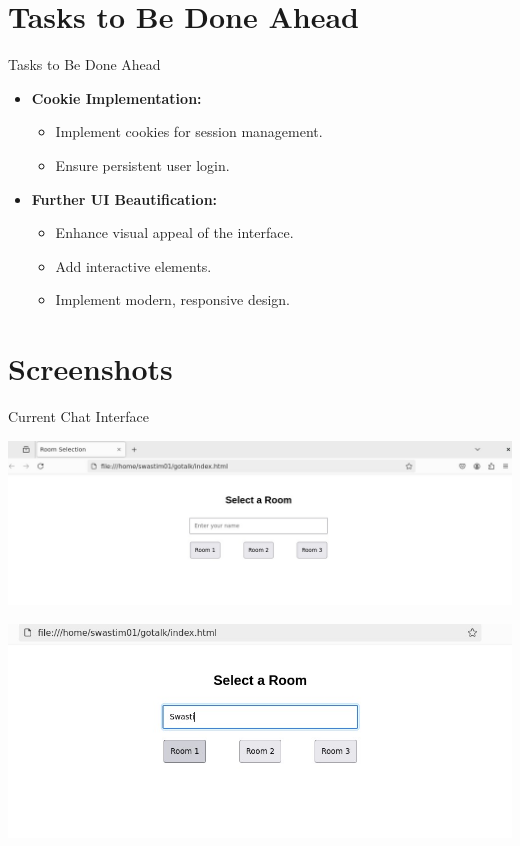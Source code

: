 \documentclass{beamer}
\begin{document}
\section{Tasks to Be Done Ahead}

\begin{frame}{Tasks to Be Done Ahead}
    \begin{itemize}
        \item \textbf{Cookie Implementation:}
        \begin{itemize}
            \item Implement cookies for session management.
            \item Ensure persistent user login.
        \end{itemize}
        \item \textbf{Further UI Beautification:}
        \begin{itemize}
            \item Enhance visual appeal of the interface.
            \item Add interactive elements.
            \item Implement modern, responsive design.
        \end{itemize}
    \end{itemize}
\end{frame}

\section{Screenshots}
\begin{frame}{Current Chat Interface}
        \begin{minipage}[t]{0.5\textwidth}
            \centering
            \includegraphics[width=\textwidth]{room created.jpg}
        \end{minipage}
        \hfill
        \begin{minipage}[t]{0.5\textwidth}
            \centering
            \includegraphics[width=\textwidth]{nameinsertion.jpg}
        \end{minipage}
\end{frame}
\end{document}
